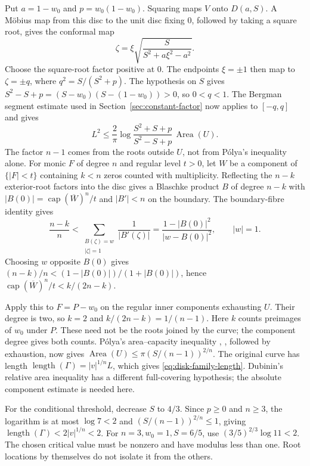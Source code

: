\documentclass[11pt]{article}
\begin{document}
Put $a=1-w_0$ and $p=w_0(1-w_0)$. Squaring maps $V$ onto $D(a,S)$.
A M\"obius map from this disc to the unit disc fixing $0$, followed by
taking a square root, gives the conformal map
\[
 \zeta=\xi\sqrt{\frac{S}{S^2+a\xi^2-a^2}}.
\]
Choose the square-root factor positive at $0$. The endpoints
$\xi=\pm1$ then map to $\zeta=\pm q$, where $q^2=S/(S^2+p)$.
The hypothesis on $S$ gives
$S^2-S+p=(S-w_0)(S-(1-w_0))>0$, so $0<q<1$.
The Bergman segment estimate used in Section~\ref{sec:constant-factor}
now applies to $[-q,q]$ and gives
\[
 L^2\le\frac2\pi\log\frac{S^2+S+p}{S^2-S+p}\,
                    \operatorname{Area}(U).
\]
The factor $n-1$ comes from the roots outside $U$, not from P\'olya's
inequality alone. For monic $F$ of degree $n$ and regular level $t>0$,
let $W$ be a component of $\{|F|<t\}$ containing $k<n$ zeros counted
with multiplicity. Reflecting the $n-k$ exterior-root factors into the
disc gives a Blaschke product $B$ of degree $n-k$ with
$|B(0)|=\operatorname{cap}(\overline W)^n/t$ and $|B'|<n$ on the boundary.
The boundary-fibre identity gives
\[
 \frac{n-k}{n}<
 \sum_{\substack{B(\zeta)=w\\|\zeta|=1}}\frac1{|B'(\zeta)|}
 =\frac{1-|B(0)|^2}{|w-B(0)|^2},\qquad |w|=1.
\]
Choosing $w$ opposite $B(0)$ gives
$(n-k)/n<(1-|B(0)|)/(1+|B(0)|)$, hence
$\operatorname{cap}(\overline W)^n/t<k/(2n-k)$.

Apply this to $F=P-w_0$ on the regular inner components exhausting $U$.
Their degree is two, so $k=2$ and $k/(2n-k)=1/(n-1)$.
Here $k$ counts preimages of $w_0$ under $P$. These need not be the
roots joined by the curve; the component degree gives both counts.
P\'olya's area--capacity inequality \cite[printed pp.~280--282]{polya1928},
\cite[Theorem~6]{crane}, followed by exhaustion, now gives
$\operatorname{Area}(U)\le\pi(S/(n-1))^{2/n}$.
The original curve has length $\operatorname{length}(\Gamma)=|v|^{1/n}L$,
which gives \eqref{eq:disk-family-length}.
Dubinin's relative area inequality \cite[Theorem~1]{dubinin} has a
different full-covering hypothesis; the absolute component estimate is
needed here.

\noindent{}\label{res:separation-parent}
For the conditional threshold, decrease $S$ to $4/3$.
Since $p\ge0$ and $n\ge3$, the logarithm is at most $\log7<2$ and
$(S/(n-1))^{2/n}\le1$, giving
$\operatorname{length}(\Gamma)<2|v|^{1/n}<2$.
For $n=3,w_0=1,S=6/5$, use $(3/5)^{2/3}\log11<2$.
The chosen critical value must be nonzero and have modulus less than
one. Root locations by themselves do not isolate it from the others.
\label{bdry:critical-value-separation}
\end{document}
